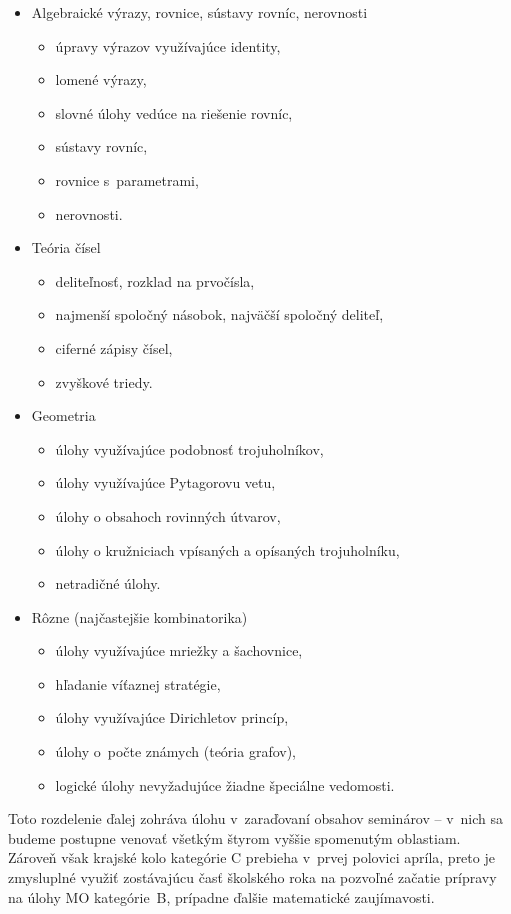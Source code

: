 \begin{itemize}
\item Algebraické výrazy, rovnice, sústavy rovníc, nerovnosti
\begin{itemize}
\item úpravy výrazov využívajúce identity,
\item lomené výrazy,
\item slovné úlohy vedúce na riešenie rovníc,
\item sústavy rovníc,
\item rovnice s~parametrami,
\item nerovnosti.
\end{itemize}
\item Teória čísel
\begin{itemize}
\item deliteľnosť, rozklad na prvočísla,
\item najmenší spoločný násobok, najväčší spoločný deliteľ,
\item ciferné zápisy čísel,
\item zvyškové triedy.
\end{itemize}
\item Geometria
\begin{itemize}
\item úlohy využívajúce podobnosť trojuholníkov,
\item úlohy využívajúce Pytagorovu vetu,
\item úlohy o obsahoch rovinných útvarov,
\item úlohy o kružniciach vpísaných a opísaných trojuholníku,
\item netradičné úlohy.
\end{itemize}
\item Rôzne (najčastejšie kombinatorika)
\begin{itemize}
\item úlohy využívajúce mriežky a šachovnice,
\item hľadanie víťaznej stratégie,
\item úlohy využívajúce Dirichletov princíp,
\item úlohy o~počte známych (teória grafov),
\item logické úlohy nevyžadujúce žiadne špeciálne vedomosti.
\end{itemize}
\end{itemize}


Toto rozdelenie ďalej zohráva úlohu v~zaraďovaní obsahov seminárov -- v~nich sa budeme postupne venovať všetkým štyrom vyššie spomenutým oblastiam. Zároveň však krajské kolo kategórie C prebieha v~prvej polovici apríla, preto je zmysluplné využiť zostávajúcu časť školského roka na pozvoľné začatie prípravy na úlohy MO kategórie~B, prípadne ďalšie matematické zaujímavosti.

